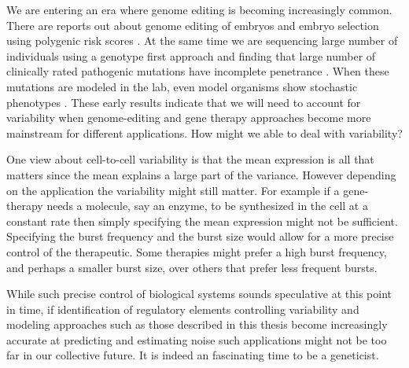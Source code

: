 We are entering an era where genome editing is becoming increasingly common. There are reports out about genome editing of embryos and embryo selection using polygenic risk scores \cite{ma2017n} \cite{pereira2022hr}. At the same time we are sequencing large number of individuals using a genotype first approach and finding that large number of clinically rated pathogenic mutations have incomplete penetrance \cite{forrest2022j}. When these mutations are modeled in the lab, even model organisms show stochastic phenotypes \cite{marmion2023cb}. These early results indicate that we will need to account for variability when genome-editing and gene therapy approaches become more mainstream for different applications. How might we able to deal with variability?

One view about cell-to-cell variability is that the mean expression is all that matters since the mean explains a large part of the variance. However depending on the application the variability might still matter. For example if a gene-therapy needs a molecule, say an enzyme, to be synthesized in the cell at a constant rate then simply specifying the mean expression might not be sufficient. Specifying the burst frequency and the burst size would allow for a more precise control of the therapeutic. Some therapies might prefer a high burst frequency, and perhaps a smaller burst size, over others that prefer less frequent bursts.

While such precise control of biological systems sounds speculative at this point in time, if identification of regulatory elements controlling variability \cite{zhao2023ng} and modeling approaches such as those described in this thesis become increasingly accurate at predicting and estimating noise such applications might not be too far in our collective future. It is indeed an fascinating time to be a geneticist.
